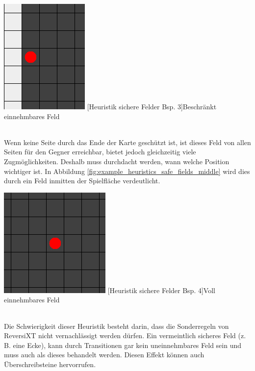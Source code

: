 \documentclass[12pt,a4paper,bibliography=totocnumbered,listof=totocnumbered]{article}
\begin{document}
\vspace{1em}
\begin{minipage}{\linewidth}
	\centering
	\includegraphics[width=0.3\linewidth]{pics/heuristics_safe_fields_outer_side.png}
	[Heuristik sichere Felder Bsp. 3]{Beschränkt einnehmbares Feld}
	\label{fig:example_heuristics_safe_fields_outer_side}
\end{minipage}
\\

Wenn keine Seite durch das Ende der Karte geschützt ist, ist dieses Feld von allen Seiten für den Gegner erreichbar, bietet jedoch gleichzeitig viele Zugmöglichkeiten. Deshalb muss durchdacht werden, wann welche Position wichtiger ist. In Abbildung \ref{fig:example_heuristics_safe_fields_middle} wird dies durch ein Feld inmitten der Spielfläche verdeutlicht.

\vspace{1em}
\begin{minipage}{\linewidth}
	\centering
	\includegraphics[width=0.3\linewidth]{pics/heuristics_safe_fields_middle.png}
	[Heuristik sichere Felder Bsp. 4]{Voll einnehmbares Feld}
	\label{fig:example_heuristics_safe_fields_middle}
\end{minipage}
\\

Die Schwierigkeit dieser Heuristik besteht darin, dass die Sonderregeln von ReversiXT nicht vernachlässigt werden dürfen. Ein vermeintlich sicheres Feld (z. B. eine Ecke), kann durch Transitionen gar kein uneinnehmbares Feld sein und muss auch als dieses behandelt werden. Diesen Effekt können auch Überschreibsteine hervorrufen.
\end{document}
